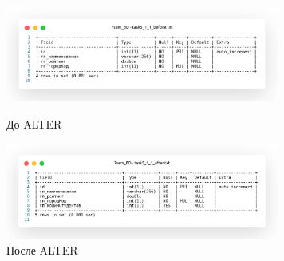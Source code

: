 \begin{figure}[!h]
  \centering

  \begin{minipage}{0.49\textwidth}
    \centering

    \includegraphics[width=9cm]
    {../sql/task5/task5_1_1_before.png}

    \caption{До ALTER}
    \label{fig:task5_1_1_before}
  \end{minipage}
  \begin{minipage}{0.49\textwidth}
    \centering

    \includegraphics[width=9cm]
    {../sql/task5/task5_1_1_after.png}

    \caption{После ALTER}
    \label{fig:task5_1_1_after}
  \end{minipage}
\end{figure}

